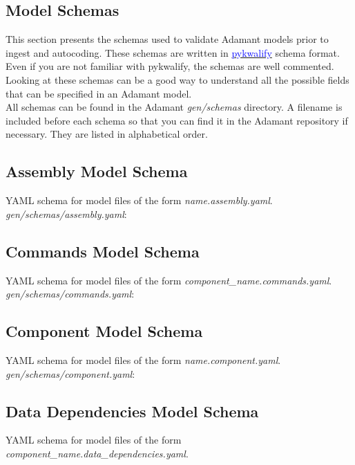 \newpage
\begin{appendices}

\section{Model Schemas}

This section presents the schemas used to validate Adamant models prior to ingest and autocoding. These schemas are written in \href{https://pykwalify.readthedocs.io/en/unstable/}{\textcolor{blue}{pykwalify}} schema format. Even if you are not familiar with pykwalify, the schemas are well commented. Looking at these schemas can be a good way to understand all the possible fields that can be specified in an Adamant model. \\

All schemas can be found in the Adamant \textit{gen/schemas} directory. A filename is included before each schema so that you can find it in the Adamant repository if necessary. They are listed in alphabetical order.

\subsection{Assembly Model Schema}
YAML schema for model files of the form \textit{name.assembly.yaml}. \\

\textit{gen/schemas/assembly.yaml}:

\subsection{Commands Model Schema}
YAML schema for model files of the form \textit{component\_name.commands.yaml}. \\

\textit{gen/schemas/commands.yaml}:

\subsection{Component Model Schema}
YAML schema for model files of the form \textit{name.component.yaml}. \\

\textit{gen/schemas/component.yaml}:

\subsection{Data Dependencies Model Schema}
YAML schema for model files of the form \textit{component\_name.data\_dependencies.yaml}. \\


\end{appendices}
